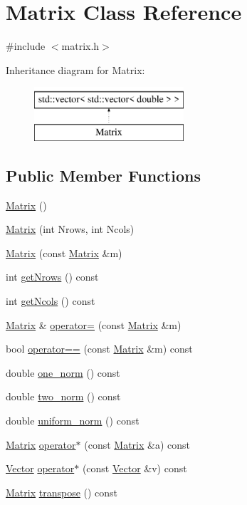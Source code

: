 \hypertarget{class_matrix}{}\section{Matrix Class Reference}
\label{class_matrix}


{\ttfamily \#include $<$matrix.\+h$>$}

Inheritance diagram for Matrix\+:\begin{figure}[H]
\begin{center}
\leavevmode
\includegraphics[height=2.000000cm]{class_matrix}
\end{center}
\end{figure}
\subsection*{Public Member Functions}
\begin{DoxyCompactItemize}
\item 
\hyperlink{class_matrix_a2dba13c45127354c9f75ef576f49269b}{Matrix} ()
\item 
\hyperlink{class_matrix_a135a15de1126d735bb95fcc839d739d7}{Matrix} (int Nrows, int Ncols)
\item 
\hyperlink{class_matrix_a765f4dcb51b6829311cc3e7576388423}{Matrix} (const \hyperlink{class_matrix}{Matrix} \&m)
\item 
int \hyperlink{class_matrix_a711f84a1c62832d9d197d78c9855a276}{get\+Nrows} () const
\item 
int \hyperlink{class_matrix_ae0a5f2154953b8d129a90b04f91d9079}{get\+Ncols} () const
\item 
\hyperlink{class_matrix}{Matrix} \& \hyperlink{class_matrix_aea5a06385f646eb4a63929fae6fa3e14}{operator=} (const \hyperlink{class_matrix}{Matrix} \&m)
\item 
bool \hyperlink{class_matrix_a35097c20bcb1495b57d452db0d7b1f53}{operator==} (const \hyperlink{class_matrix}{Matrix} \&m) const
\item 
double \hyperlink{class_matrix_af4d468252f3ecbbcaa5726c76e332b4c}{one\+\_\+norm} () const
\item 
double \hyperlink{class_matrix_aac496af05ec7aa26afc2b9c6d0ab8b66}{two\+\_\+norm} () const
\item 
double \hyperlink{class_matrix_a43066c7fe6418aad40170b85415063e8}{uniform\+\_\+norm} () const
\item 
\hyperlink{class_matrix}{Matrix} \hyperlink{class_matrix_aaa40c78e6b3bb5bbf572d35612dbf6a7}{operator$\ast$} (const \hyperlink{class_matrix}{Matrix} \&a) const
\item 
\hyperlink{class_vector}{Vector} \hyperlink{class_matrix_a843eebe2b6bd9d8091be600f685252cb}{operator$\ast$} (const \hyperlink{class_vector}{Vector} \&v) const
\item 
\hyperlink{class_matrix}{Matrix} \hyperlink{class_matrix_a759661b75b9681f3a89ff75e27933b3a}{transpose} () const
\end{DoxyCompactItemize}
